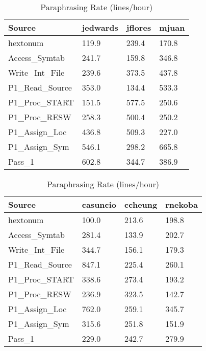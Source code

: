 \begin{table}[hb]
\begin{center}
\begin{tabular}{|l|l|l|l|}
\hline
Source & jedwards & jflores & mjuan\\
\hline
hextonum & 119.9 & 239.4 & 170.8\\
Access\_Symtab & 241.7 & 159.8 & 346.8\\
Write\_Int\_File & 239.6 & 373.5 & 437.8\\
P1\_Read\_Source & 353.0 & 134.4 & 533.3\\
P1\_Proc\_START & 151.5 & 577.5 & 250.6\\
P1\_Proc\_RESW & 258.3 & 500.4 & 250.2\\
P1\_Assign\_Loc & 436.8 & 509.3 & 227.0\\
P1\_Assign\_Sym & 546.1 & 298.2 & 665.8\\
Pass\_1 & 602.8 & 344.7 & 386.9\\
\hline
\end{tabular}
\end{center}
\caption{Paraphrasing Rate (lines/hour)}
\end{table}

\begin{table}[hb]
\begin{center}
\begin{tabular}{|l|l|l|l|}
\hline
Source & casuncio & ccheung & rnekoba\\
\hline
hextonum & 100.0 & 213.6 & 198.8\\
Access\_Symtab & 281.4 & 133.9 & 202.7\\
Write\_Int\_File & 344.7 & 156.1 & 179.3\\
P1\_Read\_Source & 847.1 & 225.4 & 260.1\\
P1\_Proc\_START & 338.6 & 273.4 & 193.2\\
P1\_Proc\_RESW & 236.9 & 323.5 & 142.7\\
P1\_Assign\_Loc & 762.0 & 259.1 & 345.7\\
P1\_Assign\_Sym & 315.6 & 251.8 & 151.9\\
Pass\_1 & 229.0 & 242.7 & 279.9\\
\hline
\end{tabular}
\end{center}
\caption{Paraphrasing Rate (lines/hour)}
\end{table}

